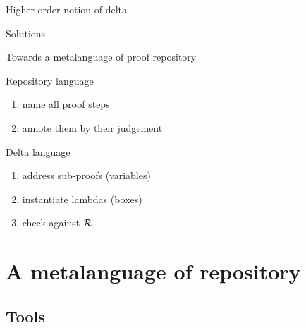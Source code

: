 \documentclass[ignorenonframetext,red]{beamer}
\begin{document}
\begin{frame}{Higher-order notion of delta}
{\begin{block}{Solutions}
\begin{itemize}
      \end{itemize}
    \end{block}
  }
\end{frame}

\begin{frame}{Towards a metalanguage of proof repository}
  \begin{block}{Repository language}
    \begin{enumerate}
    \item name all proof steps
    \item annote them by their judgement
    \end{enumerate}
  \end{block}
  \begin{block}{Delta language}
    \begin{enumerate}
    \item address sub-proofs (variables)
    \item instantiate lambdas (boxes)
    \item check against $\mathcal{R}$
    \end{enumerate}
  \end{block}
\end{frame}

\section{A metalanguage of repository}

\subsection{Tools}
\end{document}

